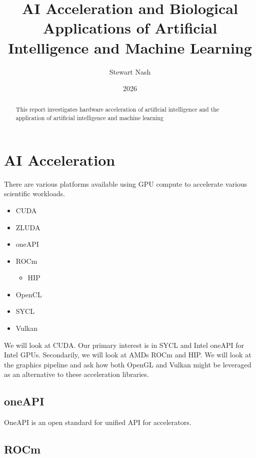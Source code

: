 \documentclass{report}
\begin{document}
\title{AI Acceleration and Biological Applications of Artificial Intelligence and Machine Learning}
\author{Stewart Nash}
\date{2026}

\maketitle

\begin{abstract}
This report investigates hardware acceleration of artificial intelligence and the application of artificial intelligence and machine learning
\end{abstract}

\tableofcontents

\chapter{AI Acceleration}

There are various platforms available using GPU compute to accelerate various scientific workloads.
\begin{itemize}
	\item CUDA
	\item ZLUDA
	\item oneAPI
	\item ROCm
		\begin{itemize}
			\item HIP
		\end{itemize}
	\item OpenCL
	\item SYCL
	\item Vulkan
\end{itemize}

We will look at CUDA. Our primary interest is in SYCL and Intel oneAPI for Intel GPUs. Secondarily, we will look at AMDs ROCm and HIP. We will look at the graphics pipeline and ask how both OpenGL and Vulkan might be leveraged as an alternative to these acceleration libraries.

\section{oneAPI}

OneAPI is an open standard for unified API for accelerators.

\section{ROCm}
\end{document}
